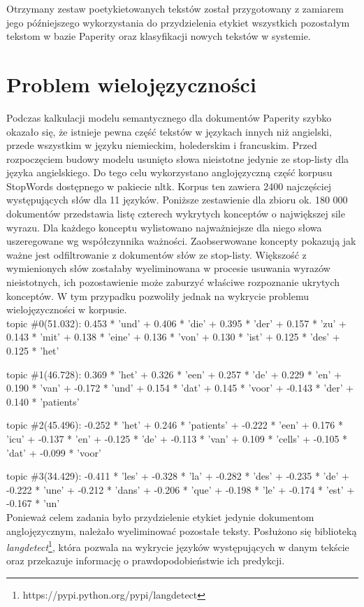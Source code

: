 \documentclass{pracamgr}
\begin{document}
Otrzymany zestaw poetykietowanych tekstów został przygotowany z zamiarem jego późniejszego wykorzystania do przydzielenia etykiet wszystkich pozostałym tekstom w bazie Paperity oraz klasyfikacji nowych tekstów w systemie.

\section{Problem wielojęzyczności}
Podczas kalkulacji modelu semantycznego dla dokumentów Paperity szybko okazało się, że istnieje pewna część tekstów w językach innych niż angielski, przede wszystkim w języku niemieckim, holederskim i francuskim. Przed rozpoczęciem budowy modelu usunięto słowa nieistotne jedynie ze stop-listy dla języka angielskiego. Do tego celu wykorzystano anglojęzyczną część korpusu StopWords dostępnego w pakiecie nltk. Korpus ten zawiera 2400 najczęściej występujących słów dla 11 języków. Poniższe zestawienie dla zbioru ok. 180 000 dokumentów przedstawia listę czterech wykrytych konceptów o największej sile wyrazu. Dla każdego konceptu wylistowano najważniejsze dla niego słowa uszeregowane wg współczynnika ważności. Zaobserwowane koncepty pokazują jak ważne jest odfiltrowanie z dokumentów słów ze stop-listy. Większość z wymienionych słów zostałaby wyeliminowana w procesie usuwania wyrazów nieistotnych, ich pozostawienie może zaburzyć właściwe rozpoznanie ukrytych konceptów. W tym przypadku pozwoliły jednak na wykrycie problemu wielojęzyczności w korpusie.
\\

topic \#0(51.032): 0.453 * 'und' + 0.406 * 'die' + 0.395 * 'der' + 0.157 * 'zu' + 0.143 * 'mit' + 0.138 * 'eine' + 0.136 * 'von' + 0.130 * 'ist' + 0.125 * 'des' + 0.125 * 'het'

topic \#1(46.728): 0.369 * 'het' + 0.326 * 'een' + 0.257 * 'de' + 0.229 * 'en' + 0.190 * 'van' + -0.172 * 'und' + 0.154 * 'dat' + 0.145 * 'voor' + -0.143 * 'der' + 0.140 * 'patients'

topic \#2(45.496): -0.252 * 'het' + 0.246 * 'patients' + -0.222 * 'een' + 0.176 * 'icu' + -0.137 * 'en' + -0.125 * 'de' + -0.113 * 'van' + 0.109 * 'cells' + -0.105 * 'dat' + -0.099 * 'voor'

topic \#3(34.429): -0.411 * 'les' + -0.328 * 'la' + -0.282 * 'des' + -0.235 * 'de' + -0.222 * 'une' + -0.212 * 'dans' + -0.206 * 'que' + -0.198 * 'le' + -0.174 * 'est' + -0.167 * 'un'
\\

Ponieważ celem zadania było przydzielenie etykiet jedynie dokumentom anglojęzycznym, należało wyeliminować pozostałe teksty. Posłużono się biblioteką \textit{langdetect}\footnote{https://pypi.python.org/pypi/langdetect}, która pozwala na wykrycie języków występujących w danym tekście oraz przekazuje informację o prawdopodobieństwie ich predykcji.
\end{document}
